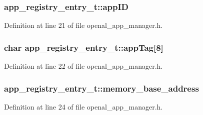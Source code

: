 \subsubsection[{\texorpdfstring{app\+ID}{appID}}]{ app\+\_\+registry\+\_\+entry\+\_\+t\+::app\+ID}\hypertarget{structapp__registry__entry__t_a673e1ebdc2c73802850a128772754698}{}\label{structapp__registry__entry__t_a673e1ebdc2c73802850a128772754698}


Definition at line 21 of file openal\+\_\+app\+\_\+manager.\+h.

\subsubsection[{\texorpdfstring{app\+Tag}{appTag}}]{\setlength{\rightskip}{0pt plus 5cm}char app\+\_\+registry\+\_\+entry\+\_\+t\+::app\+Tag\mbox{[}8\mbox{]}}\hypertarget{structapp__registry__entry__t_a8b940ede18d11ecd6e5b6c139b6ca4a0}{}\label{structapp__registry__entry__t_a8b940ede18d11ecd6e5b6c139b6ca4a0}


Definition at line 22 of file openal\+\_\+app\+\_\+manager.\+h.

\subsubsection[{\texorpdfstring{memory\+\_\+base\+\_\+address}{memory_base_address}}]{ app\+\_\+registry\+\_\+entry\+\_\+t\+::memory\+\_\+base\+\_\+address}\hypertarget{structapp__registry__entry__t_ad1d4bfecce4d3a2ed7b004f3e72bfb12}{}\label{structapp__registry__entry__t_ad1d4bfecce4d3a2ed7b004f3e72bfb12}


Definition at line 24 of file openal\+\_\+app\+\_\+manager.\+h.

